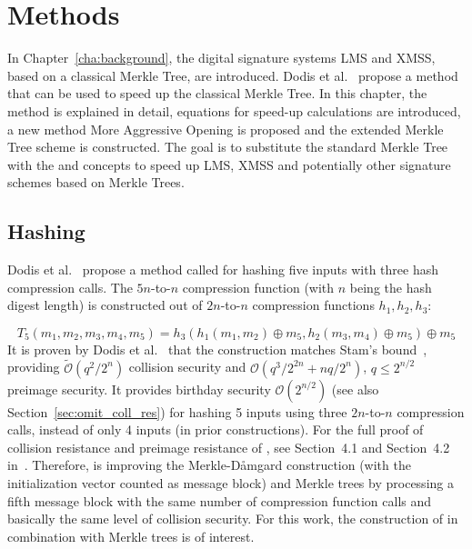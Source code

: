 \chapter{Methods}
\label{cha:methods}
In Chapter~\ref{cha:background}, the digital signature systems LMS and XMSS, based on a classical Merkle Tree, are introduced. Dodis et al.~\cite{T5_paper} propose a method \tf that can be used to speed up the classical Merkle Tree. In this chapter, the \tf method is explained in detail, equations for speed-up calculations are introduced, a new method More Aggressive Opening is proposed and the extended Merkle Tree scheme \extree is constructed. The goal is to substitute the standard Merkle Tree with the \tftree and \extree concepts to speed up LMS, XMSS and potentially other signature schemes based on Merkle Trees.

\section{\texorpdfstring{\tf}{T5} Hashing}
Dodis et al.~\cite{T5_paper} propose a method called \tf for hashing five inputs with three hash compression calls. The $5n$-to-$n$ compression function \tf (with $n$ being the hash digest length) is constructed out of $2n$-to-$n$ compression functions $h_1, h_2, h_3$:

\begin{equation}
\label{eq:t5_basic}
T_5(m_1, m_2, m_3, m_4, m_5) = h_3(h_1(m_1,m_2) \oplus m_5, h_2(m_3,m_4) \oplus m_5) \oplus m_5
\end{equation}
It is proven by Dodis et al.~\cite{T5_paper} that the \tf construction matches Stam’s bound~\cite{stams_bound2008}, providing $\tilde{\mathcal{O}}(q^2/2^n)$ collision security and $\mathcal{O}(q^3/2^{2n}+nq/2^n)$, $q \leq 2^{n/2}$ preimage security. It provides birthday security $\mathcal{O}(2^{n/2})$ (see also Section~\ref{sec:omit_coll_res}) for hashing 5 inputs using three $2n$-to-$n$ compression calls, instead of only 4 inputs (in prior constructions). For the full proof of collision resistance and preimage resistance of \tf, see Section~4.1 and Section~4.2 in~\cite{T5_paper}. %
Therefore, \tf is improving the Merkle-D\aa mgard construction (with the initialization vector counted as message block) and Merkle trees by processing a fifth message block with the same number of compression function calls and basically the same level of collision security. 
For this work, the construction of \tf in combination with Merkle trees is of interest.  


